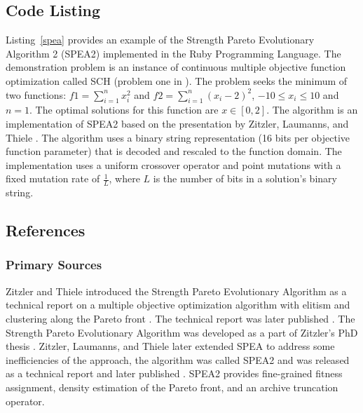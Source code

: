 \subsection{Code Listing}
Listing~\ref{spea} provides an example of the Strength Pareto Evolutionary Algorithm 2 (SPEA2) implemented in the Ruby Programming Language.
The demonstration problem is an instance of continuous multiple objective function optimization called SCH (problem one in \cite{Deb2002}). The problem seeks the minimum of two functions: $f1=\sum_{i=1}^n x_{i}^2$ and $f2=\sum_{i=1}^n (x_{i}-2)^2$, $-10\leq x_i \leq 10$ and $n=1$. The optimal solutions for this function are $x \in [0,2]$.
The algorithm is an implementation of SPEA2 based on the presentation by Zitzler, Laumanns, and Thiele \cite{Zitzler2002}.
The algorithm uses a binary string representation (16 bits per objective function parameter) that is decoded and rescaled to the function domain. The implementation uses a uniform crossover operator and point mutations with a fixed mutation rate of $\frac{1}{L}$, where $L$ is the number of bits in a solution's binary string. 



\subsection{References}

% 
% 
\subsubsection{Primary Sources}
Zitzler and Thiele introduced the Strength Pareto Evolutionary Algorithm as a technical report on a multiple objective optimization algorithm with elitism and clustering along the Pareto front \cite{Zitzler1998}. The technical report was later published \cite{Zitzler1999}.
The Strength Pareto Evolutionary Algorithm was developed as a part of Zitzler's PhD thesis \cite{Zitzler1999a}.
Zitzler, Laumanns, and Thiele later extended SPEA to address some inefficiencies of the approach, the algorithm was called SPEA2 and was released as a technical report \cite{Zitzler2001} and later published \cite{Zitzler2002}. SPEA2 provides fine-grained fitness assignment, density estimation of the Pareto front, and an archive truncation operator.

